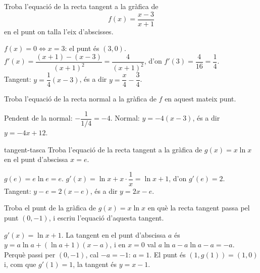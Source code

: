\begin{apartats}

Troba l'equació de la recta tangent a la gràfica de
\[
f(x)=\frac{x-3}{x+1}
\]
en el punt on talla l'eix d'abscisses.

\begin{solucio}
$f(x)=0\iff x=3$: el punt és $(3,0)$.\\
$f'(x)=\dfrac{(x+1)-(x-3)}{(x+1)^2}=\dfrac{4}{(x+1)^2}$, d'on $f'(3)=\dfrac{4}{16}=\dfrac14$.\\
Tangent: $y=\dfrac14(x-3)$, és a dir $y=\dfrac{x}{4}-\dfrac34$.
\end{solucio}

\begin{nomesllarg}
Troba l'equació de la recta normal a la gràfica de $f$ en aquest mateix punt.

\begin{solucio}
Pendent de la normal: $-\dfrac{1}{1/4}=-4$. Normal: $y=-4(x-3)$, és a dir $y=-4x+12$.
\end{solucio}
\end{nomesllarg}

\begin{tria}{tangent-tasca}
Troba l'equació de la recta tangent a la gràfica de $g(x)=x\ln x$ en el punt d'abscissa
$x=e$.

\begin{solucio}
$g(e)=e\ln e=e$. $g'(x)=\ln x+x\cdot\dfrac1x=\ln x+1$, d'on $g'(e)=2$.\\
Tangent: $y-e=2(x-e)$, és a dir $y=2x-e$.
\end{solucio}

Troba el punt de la gràfica de $g(x)=x\ln x$ en què la recta tangent passa pel punt $(0,-1)$, i
escriu l'equació d'aquesta tangent.

\begin{solucio}
$g'(x)=\ln x+1$. La tangent en el punt d'abscissa $a$ és $y=a\ln a+(\ln a+1)(x-a)$, i en $x=0$
val $a\ln a-a\ln a-a=-a$.\\
Perquè passi per $(0,-1)$, cal $-a=-1$: $a=1$. El punt és $(1,g(1))=(1,0)$ i, com que $g'(1)=1$,
la tangent és $\boxed{y=x-1}$.
\end{solucio}
\end{tria}

\end{apartats}
